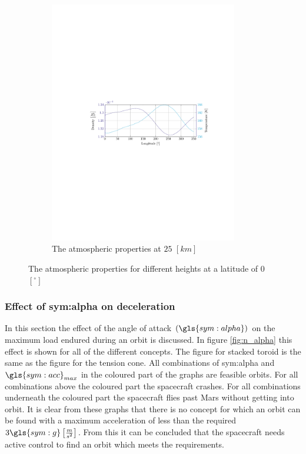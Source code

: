 \begin{figure}[ht!]
\begin{subfigure}{0.9\textwidth}
	\includegraphics[trim={4.5cm 11cm 3.1cm 11cm},clip,width=0.9\textwidth]{Figure/atmos_model/lon_25.pdf}
	\caption{The atmospheric properties at $25$ $\left[km\right]$} 
	\label{fig:atmos_lon_25}
	\end{subfigure}
	\caption{The atmospheric properties for different heights at a latitude of 0 $\left[^\circ\right]$}
	\label{fig:atmos_lon}
\end{figure}

\subsubsection{Effect of \gls{sym:alpha} on deceleration}
\label{sec:astrodec}

In this section the effect of the angle of attack $\left(\gls{sym:alpha}\right)$ on the maximum load endured during an orbit is discussed. In figure \ref{fig:n_alpha} this effect is shown for all of the different concepts. The figure for stacked toroid is the same as the figure for the tension cone. All combinations of \gls{sym:alpha} and $\gls{sym:acc}_{max}$ in the coloured part of the graphs are feasible orbits. For all combinations above the coloured part the spacecraft crashes. For all combinations underneath the coloured part the spacecraft flies past Mars without getting into orbit. It is clear from these graphs that there is no concept for which an orbit can be found with a maximum acceleration of less than the required $3 \gls{sym:g} \left[\frac{m}{s^2}\right]$. From this it can be concluded that the spacecraft needs active control to find an orbit which meets the requirements.

